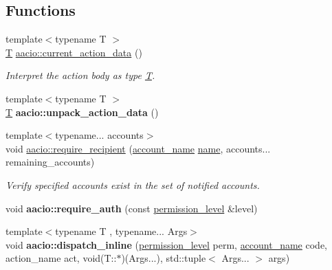 \subsection*{Functions}
\begin{DoxyCompactItemize}
\item 
{\footnotesize template$<$typename T $>$ }\\\mbox{\hyperlink{struct_t}{T}} \mbox{\hyperlink{group__actioncppapi_ga1dbfc575654dd0016e4701e719edbe28}{aacio\+::current\+\_\+action\+\_\+data}} ()
\begin{DoxyCompactList}\small\item\em Interpret the action body as type \mbox{\hyperlink{struct_t}{T}}. \end{DoxyCompactList}\item 
\mbox{\label{group__actioncppapi_ga49955f80ab60a4520ce84539bc21c233}} 
{\footnotesize template$<$typename T $>$ }\\\mbox{\hyperlink{struct_t}{T}} {\bfseries aacio\+::unpack\+\_\+action\+\_\+data} ()
\item 
{\footnotesize template$<$typename... accounts$>$ }\\void \mbox{\hyperlink{group__actioncppapi_ga21fa91780aa540fc37c9db54fec25afb}{aacio\+::require\+\_\+recipient}} (\mbox{\hyperlink{structaacio_1_1chain_1_1name}{account\+\_\+name}} \mbox{\hyperlink{structaacio_1_1name}{name}}, accounts... remaining\+\_\+accounts)
\begin{DoxyCompactList}\small\item\em Verify specified accounts exist in the set of notified accounts. \end{DoxyCompactList}\item 
\mbox{\label{group__actioncppapi_ga2fe9e8c9c64d44d4bef7fddcfd9f340f}} 
void {\bfseries aacio\+::require\+\_\+auth} (const \mbox{\hyperlink{structaacio_1_1permission__level}{permission\+\_\+level}} \&level)
\item 
\mbox{\label{group__actioncppapi_ga688202e925674a1037bc2104a31467aa}} 
{\footnotesize template$<$typename T , typename... Args$>$ }\\void {\bfseries aacio\+::dispatch\+\_\+inline} (\mbox{\hyperlink{structaacio_1_1permission__level}{permission\+\_\+level}} perm, \mbox{\hyperlink{structaacio_1_1chain_1_1name}{account\+\_\+name}} code, action\+\_\+name act, void(T\+::$\ast$)(Args...), std\+::tuple$<$ Args... $>$ args)
\end{DoxyCompactItemize}



